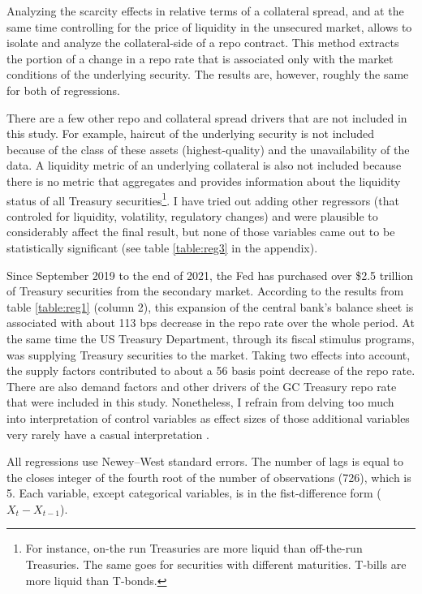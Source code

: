 \documentclass[11pt,a4paper,english,oneside]{article}
\begin{document}
Analyzing the scarcity effects in relative terms of a collateral spread, and at the same time controlling for the price of liquidity in the unsecured market, allows to isolate and analyze the collateral-side of a repo contract. This method extracts the portion of a change in a repo rate that is associated only with the market conditions of the underlying security. The results are, however, roughly the same for both of regressions.

There are a few other repo and collateral spread drivers that are not included in this study. For example, haircut of the underlying security is not included because of the class of these assets (highest-quality) and the unavailability of the data. A liquidity metric of an underlying collateral is also not included because there is no metric that aggregates and provides information about the liquidity status of all Treasury securities\footnote{For instance, on-the run Treasuries are more liquid than off-the-run Treasuries. The same goes for securities with different maturities. T-bills are more liquid than T-bonds.}. I have tried out adding other regressors (that controled for liquidity, volatility, regulatory changes) and were plausible to considerably affect the final result, but none of those variables came out to be statistically significant (see table \ref{table:reg3} in the appendix).

Since September 2019 to the end of 2021, the Fed has purchased over \$2.5 trillion of Treasury securities from the secondary market. According to the results from table \ref{table:reg1} (column 2), this expansion of the central bank's balance sheet is associated with about 113 bps decrease in the repo rate over the whole period. At the same time the US Treasury Department, through its fiscal stimulus programs, was supplying Treasury securities to the market. Taking two effects into account, the supply factors contributed to about a 56 basis point decrease of the repo rate. There are also demand factors and other drivers of the GC Treasury repo rate that were included in this study. Nonetheless, I refrain from delving too much into interpretation of control variables as effect sizes of those additional variables very rarely have a casual interpretation \citet{hunermund2020}.

All regressions use Newey–West standard errors. The number of lags is equal to the closes integer of the fourth root of the number of observations (726), which is 5. Each variable, except categorical variables, is in the fist-difference form ($X_t-X_{t-1}$).
\end{document}
